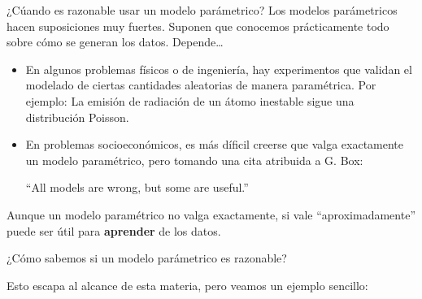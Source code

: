 \documentclass{beamer}
\theoremstyle{definition}
\begin{document}

\begin{frame}{\color{rosee}¿C\'uando es razonable usar un modelo par\'ametrico?}\small
    Los modelos par\'ametricos hacen suposiciones muy fuertes. Suponen
    que conocemos pr\'acticamente todo sobre c\'omo se generan los
    datos. Depende\dots
    \begin{itemize}
    \item En algunos problemas f\'isicos o de ingenier\'ia, hay
      experimentos que validan el modelado de ciertas cantidades
      aleatorias de manera param\'etrica. Por ejemplo: La emisión de
      radiaci\'on de un \'atomo inestable sigue una distribuci\'on Poisson.
    \item En problemas socioecon\'omicos, es m\'as d\'ificil creerse que
      valga exactamente un modelo param\'etrico, pero  tomando una cita atribuida a G. Box:\medskip
\begin{center}
     ``All models are wrong, but some are
      useful.''
\end{center}      
    \end{itemize}
    Aunque un modelo param\'etrico no valga exactamente, si vale
  ``aproximadamente'' puede ser \'util para \textbf{aprender} de los datos.
  
  \medskip
  \begin{center}
    ¿C\'omo sabemos si un modelo par\'ametrico es razonable?
  \end{center}

\medskip

  Esto escapa al alcance de esta materia, pero veamos un ejemplo sencillo:
\end{frame}
\end{document}
